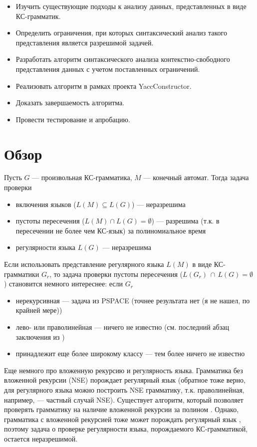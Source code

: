 \documentclass[14pt]{matmex-diploma-custom}
\begin{document}
		\begin{itemize}
			\item Изучить существующие подходы к анализу данных, представленных в виде КС-грамматик.
			\item Определить ограничения, при которых синтаксический анализ такого представления является разрешимой задачей.
			\item Разработать алгоритм синтаксического анализа контекстно-свободного представления данных с учетом поставленных ограничений.
			\item Реализовать алгоритм в рамках проекта YaccConstructor.
			\item Доказать завершаемость алгоритма.
			\item Провести тестирование и апробацию.
		\end{itemize}
	
	\section{Обзор}
	
	Пусть $G$ --- произвольная КС-грамматика, $M$ --- конечный автомат. Тогда задача проверки
	\begin{itemize}
		\item включения языков ($L(M) \subseteq L(G)$) --- неразрешима
		\item пустоты пересечения ($L(M) \cap L(G) = \emptyset$) --- разрешима (т.к. в пересечении не более чем КС-язык) за полиномиальное время \cite{Hunt}
		\item регулярности языка $L(G)$ --- неразрешима \cite{Greibach1968}
	\end{itemize} 
	
	Если использовать представление регулярного языка $L(M)$ в виде КС-грамматики $G_r$, то задача проверки пустоты пересечения ($L(G_r) \, \cap \, L(G) = \emptyset$) становится немного интереснее: если $G_r$ 
	\begin{itemize}
		\item нерекурсивная --- задача из PSPACE \cite{Nederhof} (точнее результата нет (я не нашел, по крайней мере))
		\item лево- или праволинейная --- ничего не известно (см. последний абзац заключения из \cite{Nederhof})
		\item принадлежит еще более широкому классу --- тем более ничего не известно
	\end{itemize}
	
	Еще немного про вложенную рекурсию и регулярность языка. Грамматика без вложенной рекурсии (NSE) порождает регулярный язык \cite{Chomsky} (обратное тоже верно, для регулярного языка можно построить NSE грамматику, т.к. праволинейная, например, --- частный случай NSE). Существует алгоритм, который позволяет проверять грамматику на наличие вложенной рекурсии за полином \cite{Anselmo}. Однако, грамматика с вложенной рекурсией тоже может порождать регулярный язык \cite{Andrei2004}, поэтому задача о проверке регулярности языка, порождаемого КС-грамматикой, остается неразрешимой. 
	
\end{document}
